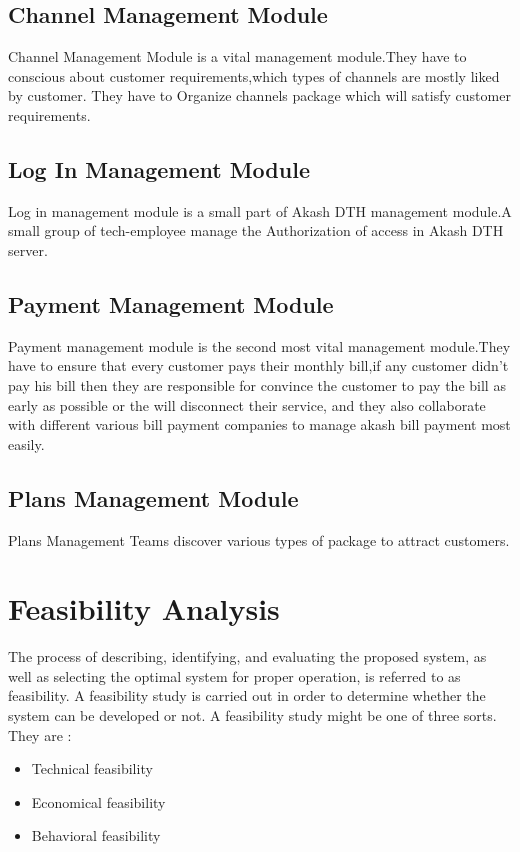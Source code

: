 \begin{spacing}{1}
\subsection{Channel Management Module}
Channel Management Module is a vital management module.They have to conscious about customer requirements,which types of channels are mostly liked by customer. They have to Organize channels package which will satisfy customer requirements.

\subsection{Log In Management Module}
Log in management module is a small part of Akash DTH management module.A small group of tech-employee manage the Authorization of access in Akash DTH server.

\subsection{Payment Management Module}
Payment management module is the second most vital management module.They have to ensure that every customer pays their monthly bill,if any customer didn't pay his bill then they are responsible for convince the customer to pay the bill as early as possible or the will disconnect their service, and they also collaborate with different various bill payment companies to manage akash bill payment most easily.

\subsection{Plans Management Module}
Plans Management Teams discover various types of package to attract customers. 

\section{Feasibility Analysis}
The process of describing, identifying, and evaluating the proposed system, as well as selecting the optimal system for proper operation, is referred to as feasibility. A feasibility study is carried out in order to determine whether the system can be developed or not. A feasibility study might be one of three sorts.
They are : 
\begin{itemize}
\item  Technical feasibility 
\item  Economical feasibility 
\item  Behavioral feasibility
\end{itemize}

\end{spacing}
